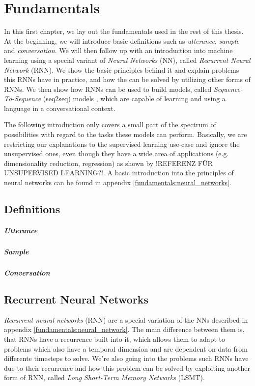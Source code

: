 \chapter{Fundamentals}
\label{chapter:fundamental}
In this first chapter, we lay out the fundamentals used in the rest of this thesis. At the beginning, we will introduce basic definitions such as \emph{utterance}, \emph{sample} and \emph{conversation}. We will then follow up with an introduction into machine learning using a special variant of \emph{Neural Networks} (NN), called \emph{Recurrent Neural Network} (RNN). We show the basic principles behind it and explain problems this RNNs have in practice, and how the can be solved by utilizing other forms of RNNs. We then show how RNNs can be used to build models, called \emph{Sequence-To-Sequence} (seq2seq) models \cite{Sutskever:2014}, which are capable of learning and using a language in a conversational context.

The following introduction only covers a small part of the spectrum of possibilities with regard to the tasks these models can perform. Basically, we are restricting our explanations to the supervised learning use-case and ignore the unsupervised ones, even though they have a wide area of applications (e.g. dimensionality reduction, regression) as shown by !REFERENZ FÜR UNSUPERVISED LEARNING?!. A basic introduction into the principles of neural networks can be found in appendix \ref{fundamentals:neural_networks}.

\section{Definitions}
\paragraph{Utterance} \blindtext
\paragraph{Sample} \blindtext
\paragraph{Conversation} \blindtext

\section{Recurrent Neural Networks}
\emph{Recurrent neural networks} (RNN) are a special variation of the NNs described in appendix \ref{fundamentals:neural_network}. The main difference between them is, that RNNs have a recurrence built into it, which allows them to adapt to problems which also have a temporal dimension and are dependent on data from differente timesteps to solve. We're also going into the problems such RNNs have due to their recurrence and how this problem can be solved by exploiting another form of RNN, called \emph{Long Short-Term Memory Networks} (LSMT).

